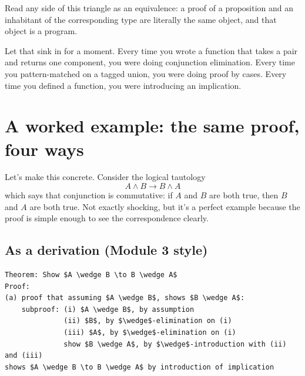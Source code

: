 \documentclass[11pt]{article}
\begin{document}
\begin{center}
\end{center}

Read any side of this triangle as an equivalence: a proof of a proposition and an inhabitant of the corresponding type are literally the same object, and that object is a program.

Let that sink in for a moment. Every time you wrote a function that takes a pair and returns one component, you were doing conjunction elimination. Every time you pattern-matched on a tagged union, you were doing proof by cases. Every time you defined a function, you were introducing an implication.

\section{A worked example: the same proof, four ways}

Let's make this concrete. Consider the logical tautology
\[
A \wedge B \to B \wedge A
\]
which says that conjunction is commutative: if $A$ and $B$ are both true, then $B$ and $A$ are both true. Not exactly shocking, but it's a perfect example because the proof is simple enough to see the correspondence clearly.

\subsection{As a derivation (Module 3 style)}

\begin{lstlisting}
Theorem: Show $A \wedge B \to B \wedge A$
Proof:
(a) proof that assuming $A \wedge B$, shows $B \wedge A$:
    subproof: (i) $A \wedge B$, by assumption
              (ii) $B$, by $\wedge$-elimination on (i)
              (iii) $A$, by $\wedge$-elimination on (i)
              show $B \wedge A$, by $\wedge$-introduction with (ii) and (iii)
shows $A \wedge B \to B \wedge A$ by introduction of implication
\end{lstlisting}
\end{document}

